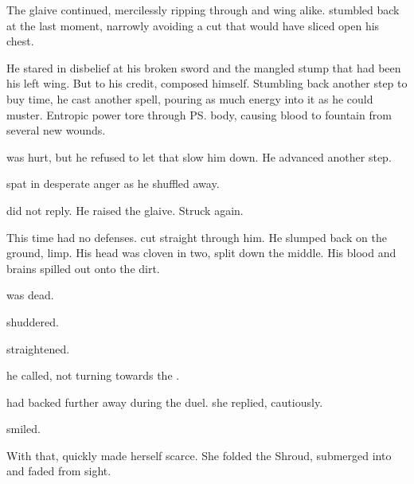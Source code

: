 The glaive continued, mercilessly ripping through \kilghan{} and wing alike. 
\Teshrial{} stumbled back at the last moment, narrowly avoiding a cut that would have sliced open his chest. 

He stared in disbelief at his broken sword and the mangled stump that had been his left wing. 
But to his credit, \Teshrial{} composed himself. 
Stumbling back another step to buy time, he cast another spell, pouring as much energy into it as he could muster. 
Entropic power tore through \ps{\Ishnaruchaefir} body, causing blood to fountain from several new wounds. 


\Ishnaruchaefir{} was hurt, but he refused to let that slow him down. 
He advanced another step. 

\Teshrial{} spat in desperate anger as he shuffled away. 

\Ishnaruchaefir{} did not reply. 
He raised the glaive. 
Struck again. 

This time \Teshrial{} had no defenses. 
\Rystessakhin{} cut straight through him. 
He slumped back on the ground, limp. 
His head was cloven in two, split down the middle. 
His blood and brains spilled out onto the dirt. 

\Teshrial{} was dead. 

\Criseis{} shuddered. 

\Ishnaruchaefir{} straightened. 

 he called, not turning towards the \resvil. 

\Achsah{} had backed further away during the duel. 
\ta{\Ishnaruchaefir,} she replied, cautiously. 

\Ishnaruchaefir{} smiled.

With that, \Achsah{} quickly made herself scarce. 
She folded the Shroud, submerged into \Nyx{} and faded from sight. 

